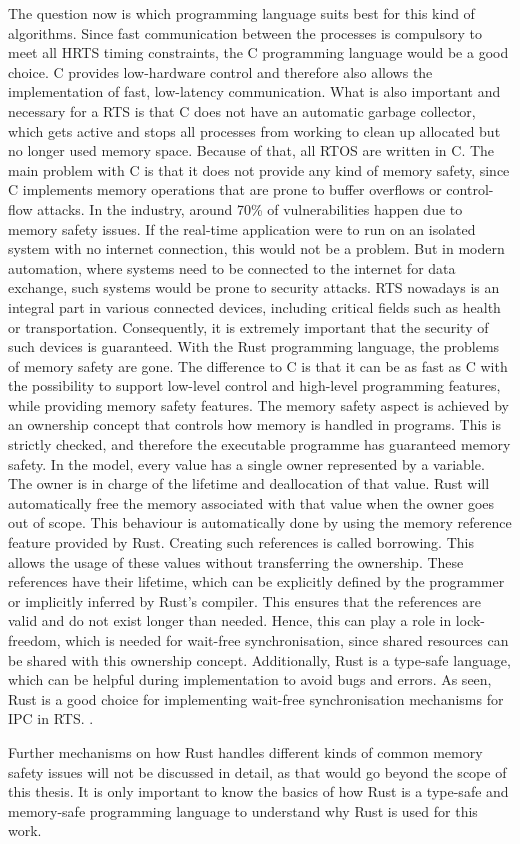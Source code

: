 The question now is which programming language suits best for this kind of algorithms. Since fast communication between the processes is compulsory to meet all \ac{HRTS} timing constraints, the C programming language would be a good choice. C provides low-hardware control and therefore also allows the implementation of fast, low-latency communication. What is also important and necessary for a \ac{RTS} is that C does not have an automatic garbage collector, which gets active and stops all processes from working to clean up allocated but no longer used memory space. Because of that, all \ac{RTOS} are written in C. The main problem with C is that it does not provide any kind of memory safety, since C implements memory operations that are prone to buffer overflows or control-flow attacks. In the industry, around 70\% of vulnerabilities happen due to memory safety issues. If the real-time application were to run on an isolated system with no internet connection, this would not be a problem. But in modern automation, where systems need to be connected to the internet for data exchange, such systems would be prone to security attacks. \ac{RTS} nowadays is an integral part in various connected devices, including critical fields such as health or transportation. Consequently, it is extremely important that the security of such devices is guaranteed. With the Rust programming language, the problems of memory safety are gone. The difference to C is that it can be as fast as C with the possibility to support low-level control and high-level programming features, while providing memory safety features. The memory safety aspect is achieved by an ownership concept that controls how memory is handled in programs. This is strictly checked, and therefore the executable programme has guaranteed memory safety. In the model, every value has a single owner represented by a variable. The owner is in charge of the lifetime and deallocation of that value. Rust will automatically free the memory associated with that value when the owner goes out of scope. This behaviour is automatically done by using the memory reference feature provided by Rust. Creating such references is called borrowing. This allows the usage of these values without transferring the ownership. These references have their lifetime, which can be explicitly defined by the programmer or implicitly inferred by Rust's compiler. This ensures that the references are valid and do not exist longer than needed. Hence, this can play a role in lock-freedom, which is needed for wait-free synchronisation, since shared resources can be shared with this ownership concept. Additionally, Rust is a type-safe language, which can be helpful during implementation to avoid bugs and errors. As seen, Rust is a good choice for implementing wait-free synchronisation mechanisms for \ac{IPC} in \ac{RTS}. \cite{xu2023rust, culic2022lowRust}. 

Further mechanisms on how Rust handles different kinds of common memory safety issues will not be discussed in detail, as that would go beyond the scope of this thesis. It is only important to know the basics of how Rust is a type-safe and memory-safe programming language to understand why Rust is used for this work.
